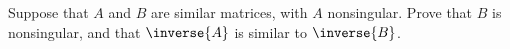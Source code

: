 Suppose that $A$ and $B$ are similar matrices, with $A$ nonsingular.  Prove that $B$ is nonsingular, and that $\inverse{A}$ is similar to $\inverse{B}$.